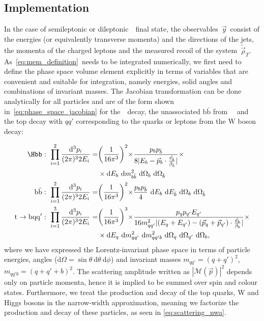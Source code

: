\subsection{Implementation}
\label{sec:mem_implementation}
In the case of semileptonic or dileptonic~\ttH~final state, the observables~$\vec{y}$~consist of the energies (or equivalently transverse momenta) and the directions of the jets, the momenta of the charged leptons and the measured recoil of the system~$\tilde{\vec{\rho}}_T$. As~\cref{eq:mem_definition}~needs to be integrated numerically, we first need to define the phase space volume element explicitly in terms of variables that are convenient and suitable for integration, namely energies, solid angles and combinations of invariant masses. The Jacobian transformation can be done analytically for all particles and are of the form shown in~\cref{eq:phase_space_jacobian} for the~\Hbb~decay, the unassociated $\mathrm{b}\bar{\mathrm{b}}$ from~\ttbb~ and the top decay with $qq'$ corresponding to the quarks or leptons from the $\mathrm{W}$ boson decay:

\begin{align}
\label{eq:phase_space_jacobian}
\Hbb:\ \prod_{i=1}^{2} \frac{\mathrm{d}^3 p_i}{(2\pi)^3 2 E_i} =& \biggr(\frac{1}{16 \pi^3}\biggl)^2 \times \frac{p_b p_{\bar{b}}}{8 |E_b - \vec{p}_b \cdot \frac{\vec{e}_{\bar{b}}}{\beta_{\bar{b}}}|} \times \\
&\times\mathrm{d}E_{b}~\mathrm{d}m^2_{b\bar{b}}~\mathrm{d}\Omega_{b}~\mathrm{d}\Omega_{\bar{b}} \\
\mathrm{b}\bar{\mathrm{b}}:\ \prod_{i=1}^{2} \frac{\mathrm{d}^3 p_i}{(2\pi)^3 2 E_i} =& \biggr(\frac{1}{16 \pi^3}\biggl)^2 \times \frac{p_b p_{\bar{b}}}{4}~\mathrm{d}E_{b}~\mathrm{d}E_{\bar{b}}~\mathrm{d}\Omega_{b}~\mathrm{d}\Omega_{\bar{b}} \\
\mathrm{t} \rightarrow \mathrm{b}\mathrm{q}\mathrm{q}':\ \prod_{i=1}^{3} \frac{\mathrm{d}^3 p_i}{(2\pi)^3 2 E_i} =& \biggr(\frac{1}{16 \pi^3}\biggl)^3 \times \frac{p_q p_{q'} E_{q'}}{16 m_{qq'}^2 |(E_q + E_{q'}) - (\vec{p}_q + \vec{p}_{q'})\cdot \frac{\vec{e}_b}{\beta_b}|}\times\\
&\times\mathrm{d}E_{q}~\mathrm{d}m^2_{qq'}~\mathrm{d}m^2_{qq'b}~\mathrm{d}\Omega_{q}~\mathrm{d}\Omega_{q'}~\mathrm{d}\Omega_b,
\end{align}
where we have expressed the Lorentz-invariant phase space in terms of particle energies, angles ($\mathrm{d}\Omega = \sin{\theta}~\mathrm{d}\theta~\mathrm{d}\phi$) and invariant masses $m_{qq'} = (q+q')^2$, $m_{qq'b} = (q + q' + b)^2$.
The scattering amplitude written as $|\mathcal{M}(\vec{p})|^2$ depends only on particle momenta, hence it is implied to be summed over spin and colour states. Furthermore, we treat the production and decay of the top quarks, W and Higgs bosons in the narrow-width approximation\cite{Berdine2007}, meaning we factorize the production and decay of these particles, as seen in \cref{eq:scattering_nwa}.


